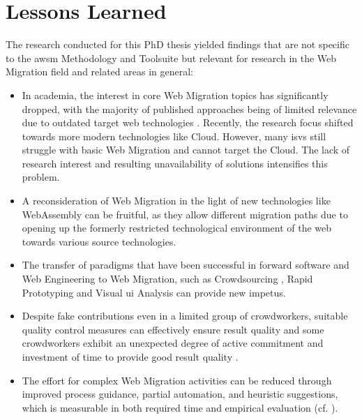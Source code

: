 \vspace{-15pt}
\hypertarget{lessons-learned}{%
\section{Lessons Learned}\label{lessons-learned}}
\vspace{15pt}

The research conducted for this PhD thesis yielded findings that are not specific to the \gls{awsm} Methodology and Toolsuite but relevant for research in the \gls{Web Migration} field and related areas in general:

\begin{itemize}
\tightlist
\item
  In academia, the interest in core \gls{Web Migration} topics has significantly dropped, with the majority of published approaches being of limited relevance due to outdated target \gls{web} technologies \autocite[cf. ][]{Heil2017Survey}.
Recently, the research focus shifted towards more modern technologies like Cloud.
However, many \glspl{isv} still struggle with basic \gls{Web Migration} and cannot target the Cloud.
The lack of research interest and resulting unavailability of solutions intensifies this problem.
\item
  A reconsideration of \gls{Web Migration} in the light of new technologies like WebAssembly can be fruitful, as they allow different migration paths due to opening up the formerly restricted technological environment of the \gls{web} towards various source technologies. \autocite[cf. ][]{Heil2018ReWaMP}
\item
  The transfer of paradigms that have been successful in forward software and \gls{Web Engineering} to \gls{Web Migration}, such as \gls{Crowdsourcing} \autocite{Heil2019CSRECCIS,Heil2018CSRE}, \gls{Rapid Prototyping} \autocite{Heil2018ReWaMP} and Visual \gls{ui} Analysis \autocite{Heil2016Similarity} can provide new impetus.
\item
  Despite fake contributions even in a limited group of crowdworkers, suitable quality control measures can effectively ensure result quality and some crowdworkers exhibit an unexpected degree of active commitment and investment of time to provide good result quality \autocite{Heil2019CSRECCIS,Heil2018CSRE}.
\item
  The effort for complex \gls{Web Migration} activities can be reduced through improved process guidance, partial automation, and heuristic suggestions, which is measurable in both required time and empirical evaluation (cf. ).

\end{itemize}
